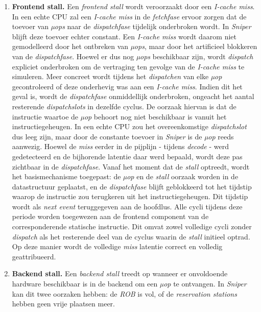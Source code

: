 \documentclass[12pt,a4paper,faculty=ea,language=nl]{ugent-doc}
\begin{document}
\begin{enumerate}
    \item{\textbf{Frontend stall.}} Een \textit{frontend stall} wordt veroorzaakt door een \textit{I-cache miss}. In een echte CPU zal een \textit{I-cache miss} in de \textit{fetchfase} ervoor zorgen dat de toevoer van \textit{µops} naar de \textit{dispatchfase} tijdelijk onderbroken wordt. In \textit{Sniper} blijft deze toevoer echter constant.
Een \textit{I-cache miss} wordt daarom niet gemodelleerd door het ontbreken van \textit{µops}, maar door het artificieel blokkeren van de \textit{dispatchfase}. Hoewel er dus nog \textit{µops} beschikbaar zijn, wordt \textit{dispatch} expliciet onderbroken om de vertraging ten gevolge van de \textit{I-cache miss} te simuleren.
Meer concreet wordt tijdens het \textit{dispatchen} van elke \textit{µop} gecontroleerd of deze onderhevig was aan een \textit{I-cache miss}. Indien dit het geval is, wordt de \textit{dispatchfase} onmiddellijk onderbroken, ongeacht het aantal resterende \textit{dispatchslots} in dezelfde cyclus.
De oorzaak hiervan is dat de instructie waartoe de \textit{µop} behoort nog niet beschikbaar is vanuit het instructiegeheugen. In een echte CPU zou het overeenkomstige \textit{dispatchslot} dus leeg zijn, maar door de constante toevoer in \textit{Sniper} is de \textit{µop} reeds aanwezig. Hoewel de \textit{miss} eerder in de pijplijn - tijdens \textit{decode} - werd gedetecteerd en de bijhorende latentie daar werd bepaald, wordt deze pas zichtbaar in de \textit{dispatchfase}.
Vanaf het moment dat de \textit{stall} optreedt, wordt het basismechanisme toegepast: de \textit{µop} en de \textit{stall} oorzaak worden in de datastructuur geplaatst, en de \textit{dispatchfase} blijft geblokkeerd tot het tijdstip waarop de instructie zou terugkeren uit het instructiegeheugen. Dit tijdstip wordt als \textit{next event} teruggegeven aan de hoofdlus.
Alle cycli tijdens deze periode worden toegewezen aan de frontend component van de corresponderende statische instructie. Dit omvat zowel volledige cycli zonder \textit{dispatch} als het resterende deel van de cyclus waarin de \textit{stall} initieel optrad.
Op deze manier wordt de volledige \textit{miss} latentie correct en volledig geattribueerd.
    \item{\textbf{Backend stall.}} Een \textit{backend stall} treedt op wanneer er onvoldoende hardware beschikbaar is in de backend om een \textit{µop} te ontvangen. In \textit{Sniper} kan dit twee oorzaken hebben: de \textit{ROB} is vol, of de \textit{reservation stations} hebben geen vrije plaatsen meer.

\end{enumerate}
\end{document}
